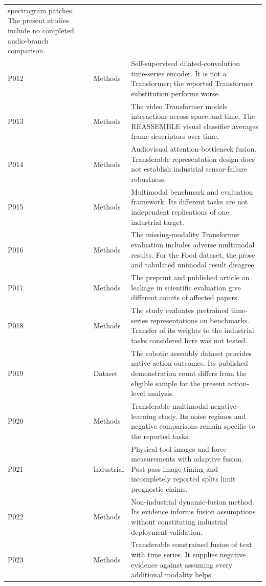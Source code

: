 \begin{longtable}{@{}P{.25\textwidth}P{.16\textwidth}P{.53\textwidth}@{}}
spectrogram patches. The present studies include no completed audio-branch comparison.
\\
P012 \citep{P012} & Methods & Self-supervised dilated-convolution time-series encoder.
It is not a Transformer; the reported Transformer substitution performs worse. \\
P013 \citep{P013} & Methods & The video Transformer models interactions across space and
time. The REASSEMBLE visual classifier averages frame descriptors over time. \\
P014 \citep{Nagrani2021MBT} & Methods & Audiovisual attention-bottleneck fusion.
Transferable representation design does not establish industrial sensor-failure
robustness. \\
P015 \citep{P015} & Methods & Multimodal benchmark and evaluation framework. Its
different tasks are not independent replications of one industrial target. \\
P016 \citep{P016} & Methods & The missing-modality Transformer evaluation includes
adverse multimodal results. For the Food dataset, the prose and tabulated unimodal
result disagree. \\
P017 \citep{P017} & Methods & The preprint and published article on leakage in
scientific evaluation give different counts of affected papers. \\
P018 \citep{P018} & Methods & The study evaluates pretrained time-series representations
on benchmarks. Transfer of its weights to the industrial tasks considered here was not
tested. \\
P019 \citep{Sliwowski2025REASSEMBLE} & Dataset & The robotic assembly dataset provides
native action outcomes. Its published demonstration count differs from the eligible
sample for the present action-level analysis. \\
P020 \citep{P020} & Methods & Transferable multimodal negative-learning study. Its noise
regimes and negative comparisons remain specific to the reported tasks. \\
P021 \citep{P021} & Industrial & Physical tool images and force measurements with
adaptive fusion. Post-pass image timing and incompletely reported splits limit
prognostic claims. \\
P022 \citep{P022} & Methods & Non-industrial dynamic-fusion method. Its evidence informs
fusion assumptions without constituting industrial deployment validation. \\
P023 \citep{P023} & Methods & Transferable constrained fusion of text with time series.
It supplies negative evidence against assuming every additional modality helps. \\

\end{longtable}
